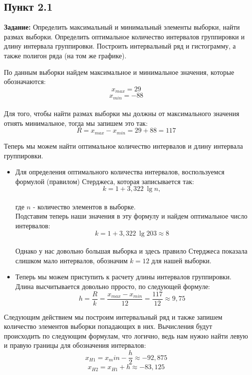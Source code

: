 \documentclass[12pt]{article}
\begin{document}
\subsection*{Пункт 2.1}
\textbf{Задание:} Определить максимальный и минимальный элементы выборки, найти размах выборки. Определить оптимальное количество интервалов группировки и длину интервала группировки. Построить интервальный ряд и гистограмму, а также полигон ряда (на том же графике).\\
\vspace{5mm}

По данным выборки найдем максимальное и минимальное значения, которые обозначаются:
$$ x_{max} = 29 $$
$$ x_{min} = -88 $$\\

Для того, чтобы найти размах выборки мы должны от максимального значения отнять минимальное, тогда мы запишем это так:
$$ R = x_{max} - x_{min} = 29 + 88 = 117 $$

Теперь мы можем найти оптимальное количество интервалов и длину интервала группировки.\\
 \begin{itemize}
     \item Для определения оптимального количества интервалов, воспользуемся формулой (правилом) Стерджеса, которая записывается так: $$ k = 1 + 3,322\ \lg n, $$\\где $n$ - количество элементов в выборке.\\ Подставим теперь наши значения в эту формулу и найдем оптимальное число интервалов:  $$ k = 1 + 3,322\ \lg 203 \approx 8 $$\\ Однако у нас довольно большая выборка и здесь правило Стерджеса показала слишком мало интервалов, обозначим $k = 12$ для нашей выборки.

    \item Теперь мы можем приступить к расчету длины интервалов группировки. Длина высчитывается довольно прросто, по следующей формуле: $$ h = \frac{R}{k} = \frac{x_{max} - x_{min}}{12} = \frac{117}{12} \approx 9,75 $$
     
 \end{itemize}

Следующим действием мы построим интервальный ряд и также запишем количество элементов выборки попадающих в них. Вычисления будут происходить по следующим формулам, что логично, ведь нам нужно найти левую и правую границы для обозначения интервалов:
$$ x_{H1} = x_min - \frac{h}{2} \approx -92,875 $$
$$ x_{H2} = x_{H1} + h \approx -83,125 $$
\end{document}
